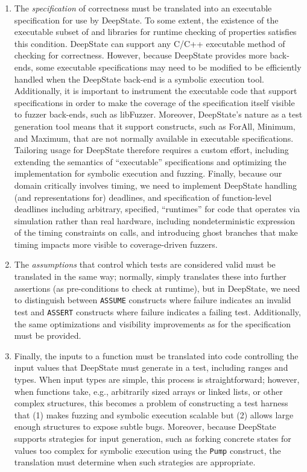 \begin{enumerate}[labelsep=3pt,leftmargin=12pt]
\item The \emph{specification} of correctness must be translated into an executable specification for use by DeepState.  To some extent, the existence of the \eacsl executable subset of \acsl and libraries for runtime checking of properties satisfies this condition.  DeepState can support any C/C++ executable method of checking for correctness.  However, because DeepState provides more back-ends, some executable specifications may need to be modified to be efficiently handled when the DeepState back-end is a symbolic execution tool.  Additionally, it is important to instrument the executable code that support specifications in order to make the coverage of the specification itself visible to fuzzer back-ends, such as libFuzzer.  Moreover, DeepState's nature as a test generation tool means that it support constructs, such as ForAll, Minimum, and Maximum, that are not normally available in executable specifications.  Tailoring \eacsl usage for DeepState therefore requires a custom effort, including extending the semantics of ``executable'' specifications and optimizing the implementation for symbolic execution and fuzzing.  Finally, because our domain critically involves timing, we need to implement DeepState handling (and \eacsl representations for) deadlines, and specification of function-level deadlines including arbitrary, specified, ``runtimes'' for code that operates via simulation rather than real hardware, including nondeterministic expression of the timing constraints on calls, and introducing ghost branches that make timing impacts more visible to coverage-driven fuzzers.
\item The \emph{assumptions} that control which tests are considered valid must be translated in the same way; normally, \eacsl simply translates these into further assertions (as pre-conditions to check at runtime), but in DeepState, we need to distinguish between {\tt ASSUME} constructs where failure indicates an invalid test and {\tt ASSERT} constructs where failure indicates a failing test.  Additionally, the same optimizations and visibility improvements as for the specification must be provided.
\item Finally, the inputs to a function must be translated into code controlling the input values that DeepState must generate in a test, including ranges and types.  When input types are simple, this process is straightforward; however, when functions take, e.g., arbitrarily sized arrays or linked lists, or other complex structures, this becomes a problem of constructing a test harness that (1) makes fuzzing and symbolic execution scalable but (2) allows large enough structures to expose subtle bugs.  Moreover, because DeepState supports strategies for input generation, such as forking concrete states for values too complex for symbolic execution using the {\tt Pump} construct, the translation must determine when such strategies are appropriate.
\end{enumerate}

